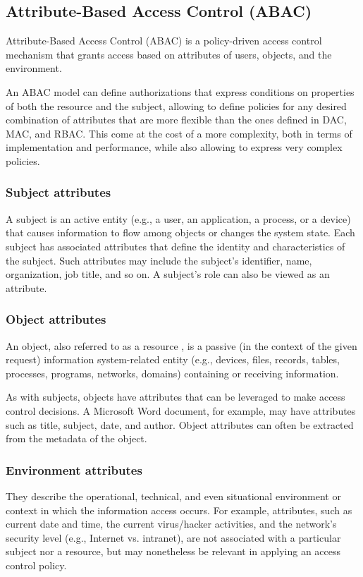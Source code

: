 \subsection{Attribute-Based Access Control (ABAC)}
Attribute-Based Access Control (ABAC) is a policy-driven access
control mechanism that grants access based on attributes of users,
objects, and the environment. 

An ABAC model can define authorizations that express conditions on
properties of both the resource and the subject, allowing to define
policies for any desired combination of attributes that are more 
flexible than the ones defined in DAC, MAC, and RBAC.
This come at the cost of a more complexity, both in terms of
implementation and performance, while also allowing to express very
complex policies.

\subsubsection{Subject attributes}
A subject is an active entity (e.g., a user, an application, a
process, or a device) that causes information to flow among objects or
changes the system state.
Each subject has associated attributes that define the identity and
characteristics of the subject. Such attributes may include the
subject’s identifier, name, organization, job title, and so on.
A subject’s role can also be viewed as an attribute.

\subsubsection{Object attributes}
An object, also referred to as a resource , is a passive (in the
context of the given request) information system-related entity (e.g.,
devices, files, records, tables, processes, programs, networks,
domains) containing or receiving information.

As with subjects, objects have attributes that can be leveraged to
make access control decisions.
A Microsoft Word document, for example, may have attributes such as
title, subject, date, and author.
Object attributes can often be extracted from the metadata of the object.

\subsubsection{Environment attributes}
They describe the operational, technical, and even situational
environment or context in which the information access occurs.
For example, attributes, such as current date and time, the current
virus/hacker activities, and the network’s security level (e.g.,
Internet vs. intranet), are not associated with a particular subject
nor a resource, but may nonetheless be relevant in applying an access
control policy.
